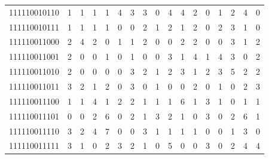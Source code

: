 \documentclass[10pt,a4paper]{article}
\begin{document}
\begin{longtable}{ |c|c|c|c|c|c|c|c|c|c|c|c|c|c|c|c|c| }
    111110010110              & 1                            & 1                                & 1                            & 1                              & 4   & 3   & 3   & 0   & 4   & 4   & 2   & 0   & 1   & 2   & 4   & 0   \\
    111110010111              & 1                            & 1                                & 1                            & 1                              & 0   & 0   & 2   & 1   & 2   & 1   & 2   & 0   & 2   & 3   & 1   & 0   \\
    111110011000              & 2                            & 4                                & 2                            & 0                              & 1   & 1   & 2   & 0   & 0   & 2   & 2   & 0   & 0   & 3   & 1   & 2   \\
    111110011001              & 2                            & 0                                & 0                            & 1                              & 0   & 1   & 0   & 0   & 3   & 1   & 4   & 1   & 4   & 3   & 0   & 2   \\
    111110011010              & 2                            & 0                                & 0                            & 0                              & 0   & 3   & 2   & 1   & 2   & 3   & 1   & 2   & 3   & 5   & 2   & 2   \\
    111110011011              & 3                            & 2                                & 1                            & 2                              & 0   & 3   & 0   & 1   & 0   & 0   & 2   & 0   & 1   & 0   & 2   & 3   \\
    111110011100              & 1                            & 1                                & 4                            & 1                              & 2   & 2   & 1   & 1   & 1   & 6   & 1   & 3   & 1   & 0   & 1   & 1   \\
    111110011101              & 0                            & 0                                & 2                            & 6                              & 0   & 2   & 1   & 3   & 2   & 1   & 0   & 3   & 0   & 2   & 6   & 1   \\
    111110011110              & 3                            & 2                                & 4                            & 7                              & 0   & 0   & 3   & 1   & 1   & 1   & 1   & 0   & 0   & 1   & 3   & 0   \\
    111110011111              & 3                            & 1                                & 0                            & 2                              & 3   & 2   & 1   & 0   & 5   & 0   & 0   & 3   & 0   & 2   & 4   & 4   \\

\end{longtable}
\end{document}
